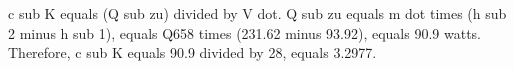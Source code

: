 c sub K equals (Q sub zu) divided by V dot.  
Q sub zu equals m dot times (h sub 2 minus h sub 1), equals Q658 times (231.62 minus 93.92), equals 90.9 watts.  
Therefore, c sub K equals 90.9 divided by 28, equals 3.2977.